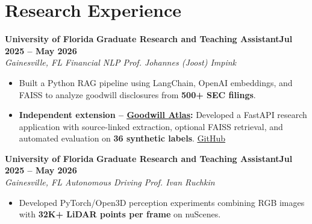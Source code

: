 \documentclass[10pt,letterpaper]{article}
\newcommand{\workEntry}[4]{%
  \textbf{#1} \textbar{} \textbf{#2}\hfill\textbf{#4}\\[-1.0pt]
  \textit{#3}\par\vspace{-1.3pt}
}
\begin{document}
\section{Research Experience}
\workEntry{University of Florida}{Graduate Research and Teaching Assistant}{Gainesville, FL \textbar{} Financial NLP \textbar{} Prof. Johannes (Joost) Impink}{Jul 2025 -- May 2026}
\begin{itemize}
  \item Built a Python RAG pipeline using LangChain, OpenAI embeddings, and FAISS to analyze goodwill disclosures from \textbf{500+ SEC filings}.
  \item \textbf{Independent extension -- \href{https://github.com/parvathinalla/goodwill-atlas}{\underline{Goodwill Atlas}}:} Developed a FastAPI research application with source-linked extraction, optional FAISS retrieval, and automated evaluation on \textbf{36 synthetic labels}. \href{https://github.com/parvathinalla/goodwill-atlas}{\underline{GitHub}}
\end{itemize}
\vspace{0pt}
\workEntry{University of Florida}{Graduate Research and Teaching Assistant}{Gainesville, FL \textbar{} Autonomous Driving \textbar{} Prof. Ivan Ruchkin}{Jul 2025 -- May 2026}
\begin{itemize}
  \item Developed PyTorch/Open3D perception experiments combining RGB images with \textbf{32K+ LiDAR points per frame} on nuScenes.
\end{itemize}
\end{document}
